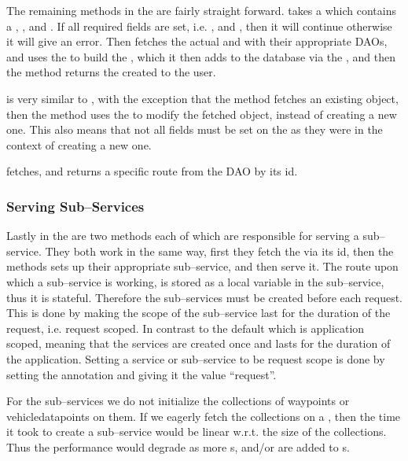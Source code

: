 \bigskip
The remaining methods in the  are fairly straight forward.
 takes a  which contains a , , and .
If all required fields are set, i.e. , and , then it will continue otherwise it will give an error.
Then  fetches the actual  and  with their appropriate \acp{DAO}, and uses the  to build the , 
which it then adds to the database via the , and then the method returns the  created to the user. 

 is very similar to , with the exception that the method fetches an existing object, 
then the method uses the  to modify the fetched object, instead of creating a new one.
This also means that not all fields must be set on the  as they were in the context of creating a new one.

 fetches, and returns a specific route from the \ac{DAO} by its id.

\subsubsection*{Serving Sub--Services}
Lastly in the  are two methods each of which are responsible for serving a sub--service.
They both work in the same way, first they fetch the  via its id, then the methods sets up their appropriate sub--service, and then serve it.
The route upon which a sub--service is working, is stored as a local variable in the sub--service, thus it is stateful. 
Therefore the sub--services must be created before each request.
This is done by making the scope of the sub--service last for the duration of the request, i.e. request scoped.
In contrast to the default which is application scoped, meaning that the services are created once and lasts for the duration of the application.
Setting a service or sub--service to be request scope is done by setting the  annotation and giving it the value ``request''.

For the sub--services we do not initialize the collections of waypoints or vehicledatapoints on them.
If we eagerly fetch the collections on a , then the time it took to create a sub--service would be linear w.r.t. the size of the collections.
Thus the performance would degrade as more s, and/or  are added to s.

